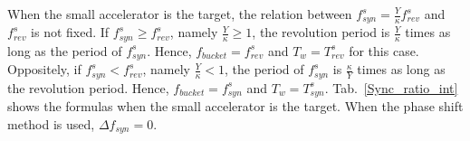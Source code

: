 
When the small accelerator is the target, the relation between $f_{\mathit{syn}}^{s}=\frac{Y}{\kappa}f_{\mathit{rev}}^{s}$ and $f_{\mathit{rev}}^{s}$ is not fixed. If $f_{\mathit{syn}}^{s}\ge f_{\mathit{rev}}^{s}$, namely $\frac{Y}{\kappa}\ge 1$, the revolution period is $\frac{Y}{\kappa}$ times as long as the period of $f_{\mathit{syn}}^{s}$. Hence, $f_\mathit{bucket}=f_{\mathit{rev}}^{s}$ and $T_w=T_{\mathit{rev}}^{s}$ for this case.
Oppositely,  if $f_{\mathit{syn}}^{s}<f_{\mathit{rev}}^{s}$, namely $\frac{Y}{\kappa}<1$, the period of $f_{\mathit{syn}}^{s}$ is $\frac{\kappa}{Y}$ times as long as the revolution period. Hence, $f_\mathit{bucket}=f_{\mathit{syn}}^{s}$ and $T_w=T_{\mathit{syn}}^{s}$. Tab.~\ref{Sync_ratio_int} shows the formulas when the small accelerator is the target. When the phase shift method is used, $\Delta f_\mathit{syn}=0$.

